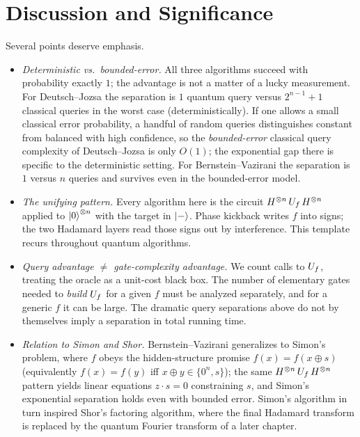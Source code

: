 \section{Discussion and Significance}

\begin{remark}
\label{l3:rem:significance}
Several points deserve emphasis.
\begin{itemize}
\item \emph{Deterministic vs.\ bounded-error.} All three algorithms succeed with
probability exactly $1$; the advantage is not a matter of a lucky measurement. For
Deutsch--Jozsa the separation is $1$ quantum query versus $2^{n-1}+1$ classical
queries in the worst case (deterministically). If one allows a small classical
error probability, a handful of random queries distinguishes constant from
balanced with high confidence, so the \emph{bounded-error} classical query
complexity of Deutsch--Jozsa is only $O(1)$; the exponential gap there is specific
to the deterministic setting. For Bernstein--Vazirani the separation is $1$ versus
$n$ queries and survives even in the bounded-error model.
\item \emph{The unifying pattern.} Every algorithm here is the circuit
$H^{\otimes n}\,U_f\,H^{\otimes n}$ applied to $\ket{0}^{\otimes n}$ with the target
in $\ket{-}$. Phase kickback writes $f$ into signs; the two Hadamard layers read
those signs out by interference. This template recurs throughout quantum
algorithms.
\item \emph{Query advantage $\neq$ gate-complexity advantage.} We count calls to
$U_f$, treating the oracle as a unit-cost black box. The number of elementary
gates needed to \emph{build} $U_f$ for a given $f$ must be analyzed separately, and
for a generic $f$ it can be large. The dramatic query separations above do not by
themselves imply a separation in total running time.
\item \emph{Relation to Simon and Shor.} Bernstein--Vazirani generalizes to
Simon's problem, where $f$ obeys the hidden-structure promise
$f(x)=f(x\oplus s)$ (equivalently $f(x)=f(y)$ iff $x\oplus y\in\{0^n,s\}$); the
same $H^{\otimes n}\,U_f\,H^{\otimes n}$ pattern yields linear equations
$z\cdot s=0$ constraining $s$, and Simon's exponential separation holds even with
bounded error. Simon's algorithm in turn inspired Shor's factoring algorithm,
where the final Hadamard transform is replaced by the quantum Fourier transform of
a later chapter.
\end{itemize}
\end{remark}

